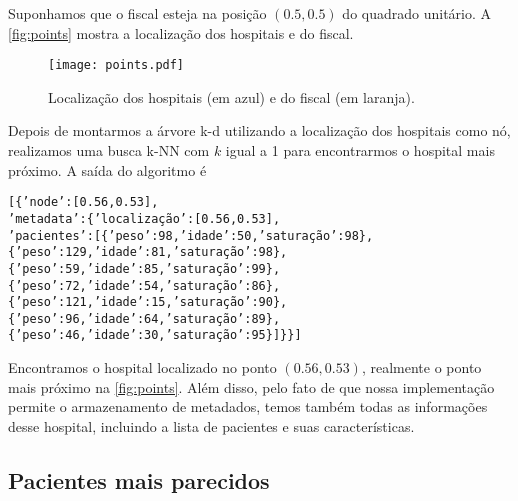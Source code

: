         Suponhamos que o fiscal esteja na posição $(0.5, 0.5)$ do quadrado unitário. A \autoref{fig:points} mostra a localização dos hospitais e do fiscal.
        \begin{figure}[H]
            \centering
            \texttt{[image: points.pdf]}
            \caption{Localização dos hospitais (em azul) e do fiscal (em laranja).}
            \label{fig:points}
        \end{figure}
        Depois de montarmos a árvore k-d utilizando a localização dos hospitais como nó, realizamos uma busca k-NN com $k$ igual a 1 para encontrarmos o hospital mais próximo. A saída do algoritmo é
        \begin{alltt}
[\{'node': [0.56, 0.53],
  'metadata': \{'localização': [0.56, 0.53],
   'pacientes': [\{'peso': 98, 'idade': 50, 'saturação': 98\},
    \{'peso': 129, 'idade': 81, 'saturação': 98\},
    \{'peso': 59, 'idade': 85, 'saturação': 99\},
    \{'peso': 72, 'idade': 54, 'saturação': 86\},
    \{'peso': 121, 'idade': 15, 'saturação': 90\},
    \{'peso': 96, 'idade': 64, 'saturação': 89\},
    \{'peso': 46, 'idade': 30, 'saturação': 95\}]\}\}]
        \end{alltt}
        Encontramos o hospital localizado no ponto $(0.56, 0.53)$, realmente o ponto mais próximo na \autoref{fig:points}. Além disso, pelo fato de que nossa implementação permite o armazenamento de metadados, temos também todas as informações desse hospital, incluindo a lista de pacientes e suas características.

    \subsection{Pacientes mais parecidos}
